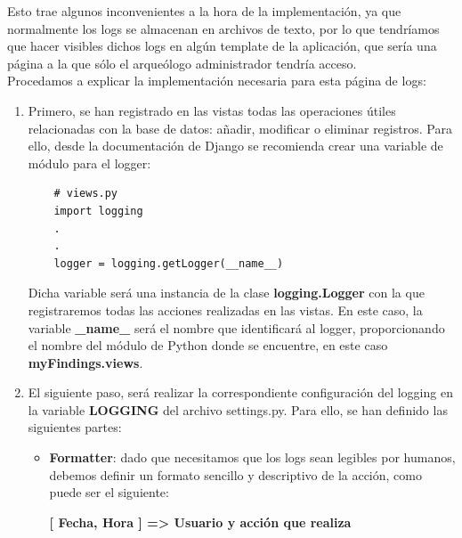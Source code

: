 Esto trae algunos inconvenientes a la hora de la implementación, ya que normalmente los
logs se almacenan en archivos de texto, por lo que tendríamos que hacer visibles dichos
logs en algún template de la aplicación, que sería una página a la que sólo el arqueólogo
administrador tendría acceso. \\

Procedamos a explicar la implementación necesaria para esta página de logs:

    \begin{enumerate}
        \item Primero, se han registrado en las vistas todas las operaciones útiles
        relacionadas con la base de datos: añadir, modificar o eliminar registros. Para
        ello, desde la documentación de Django se recomienda crear una variable de módulo
        para el logger:

    
    \begin{verbatim}
    # views.py
    import logging
    .
    .
    logger = logging.getLogger(__name__)
    \end{verbatim}

        Dicha variable será una instancia de la clase \textbf{logging.Logger} con la que
        registraremos todas las acciones realizadas en las vistas. En este caso, la variable
        \textbf{\_name\_} será el nombre que identificará al logger,
        proporcionando el nombre del módulo de Python donde se encuentre, en este caso
        \textbf{myFindings.views}.
        
        \item El siguiente paso, será realizar la correspondiente configuración del logging
        en la variable \textbf{LOGGING} del archivo settings.py. Para ello, se han
        definido las siguientes partes:

            \begin{itemize}
                \item \textbf{Formatter}: dado que necesitamos que los logs sean legibles
                por humanos, debemos definir un formato sencillo y descriptivo de la
                acción, como puede ser el siguiente:
                \begin{center}
                    \textbf{[ Fecha, Hora ] => Usuario y acción que realiza} 
                \end{center}


\end{itemize}
\end{enumerate}
